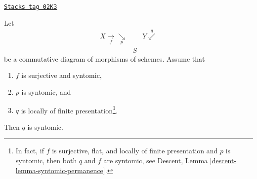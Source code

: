 \begin{lemma}
\label{morphisms-lemma-syntomic-permanence}
\href{https://stacks.math.columbia.edu/tag/02K3}{\texttt{Stacks tag 02K3}}

Let
$$
\begin{array}{ccc}X \underset{f}{\longrightarrow}\underset{p}{\searrow} &  & Y \overset{q}{\swarrow} \\  & S & \end{array}
$$
be a commutative diagram of morphisms of schemes. Assume that
\begin{enumerate}
\item $f$ is surjective and syntomic,
\item $p$ is syntomic, and
\item $q$ is locally of finite presentation\footnote{In fact, if $f$ is
surjective, flat, and locally of finite presentation and $p$ is syntomic,
then both $q$ and $f$ are syntomic, see
Descent, Lemma \ref{descent-lemma-syntomic-permanence}.}.
\end{enumerate}
Then $q$ is syntomic.
\end{lemma}

